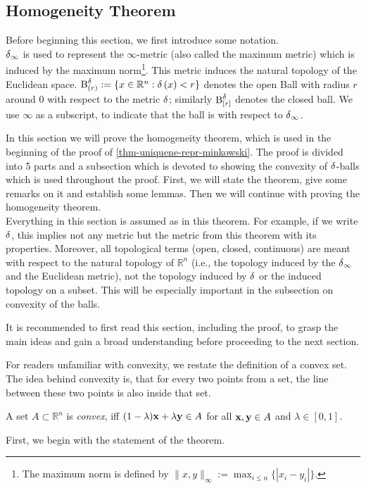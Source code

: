 \subsection{Homogeneity Theorem} \label{sect-homogeneity-theorem}
Before beginning this section, we first introduce some notation.\\
$\operatorname{\delta}_{\infty}$ is used to represent the $\infty$-metric (also called the maximum metric) which is induced by the maximum norm\footnote{The maximum norm is defined by $\|x,y\|_\infty := \max_{i \leq n} \{|x_i - y_i|\}.$}. This metric induces the natural topology of the Euclidean space.
$\operatorname{B}^{\operatorname{\delta}}_{(r)} := \{x \in \mathbb{R}^{n}: \operatorname{\delta} \left( x \right) < r\} $ denotes the open Ball with radius $r$ around $0$ with respect to the metric $\operatorname{\delta}$; similarly $\operatorname{B}^{\operatorname{\delta}}_{[r]}$ denotes the closed ball. We use $\infty$ as a subscript, to indicate that the ball is with respect to $\operatorname{\delta}_{\infty}$.

In this section we will prove the homogeneity theorem, which is used in the beginning of the proof of \cref{thm-uniquene-repr-minkowski}.
The proof is divided into 5 parts and a subsection which is devoted to showing the convexity of $\operatorname{\delta}$-balls which is used throughout the proof.
First, we will state the theorem, give some remarks on it and establish some lemmas. Then we will continue with proving the homogeneity theorem.\\
Everything in this section is assumed as in this theorem. For example, if we write $\operatorname{\delta}$, this implies not any metric but the metric from this theorem with its properties.
Moreover, all topological terms (open, closed, continuous) are meant with respect to the natural topology of $\mathbb{R}^{n}$ (i.e., the topology induced by the $\operatorname{\delta}_{\infty}$ and the Euclidean metric), not the topology induced by $\operatorname{\delta}$ or the induced topology on a subset. This will be especially important in the subsection on convexity of the balls.

It is recommended to first read this section, including the proof, to grasp the main ideas and gain a broad understanding before proceeding to the next section.

For readers unfamiliar with convexity, we restate the definition of a convex set. The idea behind convexity is, that for every two points from a set, the line between these two points is also inside that set.

\begin{defi}[Convexity]
	A set $A \subset \mathbb{R}^{n}$ is \emph{convex}, iff $(1 - \lambda) \mathbf{x} + \lambda \mathbf{y} \in A$ for all $\mathbf{x}, \mathbf{y} \in A$ and $\lambda \in [0,1]$. 
\end{defi}
First, we begin with the statement of the theorem.

